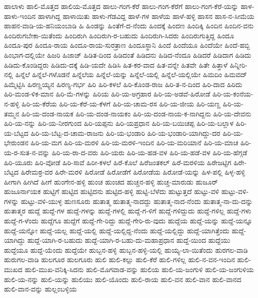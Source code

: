 {ಹಾಲಾಳು
ಹಾಲಿ-ಮೊತ್ತದ
ಹಾಲಿಯ-ಮೊತ್ತದ
ಹಾಲು-ಗಂಗ-ಕೆರೆ
ಹಾಲು-ಗಂಗ-ಕೆರೆಗೆ
ಹಾಲು-ಗಂಗ-ಕೆರೆ-ಯನ್ನು
ಹಾಳ-ಹಾಳು-ಇಂದಿನ
ಹಾಳಾಗಿದ್ದ
ಹಾಳಾಯಿತು
ಹಾಳು-ಗೆಡವಿದ್ದ
ಹಾಳೆ-ಗಳ
ಹಾಳೆಯ
ಹಾಳೆ-ಹಳ್ಳಿ
ಹಾಸನ
ಹಾಸ-ನ-ಸೀಮೆಯ
ಹಾಹನ-ವಾಡಿ-ಯ-ಹನಿಯಂಬಾಡಿ
ಹಿ
ಹಿಂಡನ್ನು
ಹಿಂತೆಗೆ-ದ-ನೆಂದು
ಹಿಂದಕ್ಕೆ
ಹಿಂದಣ
ಹಿಂದಿಕ್ಕಿ
ಹಿಂದಿನ
ಹಿಂದಿನ-ವನು
ಹಿಂದಿರುಗಬೇಕಾ-ಯಿತೆಂದು
ಹಿಂದಿರುಗಿ
ಹಿಂದಿರುಗಿ-ರ-ಬಹುದು
ಹಿಂದಿರುಗಿ-ಸಿದರು
ಹಿಂದಿರುಗುತ್ತಿದ್ದ
ಹಿಂದೂ
ಹಿಂದೂ-ಪುರ
ಹಿಂದೂ-ರಾಯ
ಹಿಂದೂ-ರಾಯ-ಸುರತ್ರಾಣ
ಹಿಂದೂಸ್ಥಾನಿ
ಹಿಂದೆ
ಹಿಂದೆಯೂ
ಹಿಂದೆಯೇ
ಹಿಂದೆ-ಹಬ್ಬಿ
ಹಿಂಭಾಗ-ದಲ್ಲಿಯೇ
ಹಿಜರಿ
ಹಿಜಾಜ್
ಹಿಡಿತ-ದಿಂದ
ಹಿಡಿದಂತೆ
ಹಿಡಿದನು
ಹಿಡಿದ-ನೆಂದೂ
ಹಿಡಿದರೆ
ಹಿಡಿದಾಗ
ಹಿಡಿದು
ಹಿಡಿದು-ಕೊಂಡಿದ್ದರು
ಹಿಡಿದು-ದಕ್ಕೆ
ಹಿಡಿ-ಯದೇ
ಹಿಡಿಸಿ
ಹಿತ-ಕರ-ವಾದ
ಹಿತ-ವನ್ನೇ
ಹಿತವೇ
ಹಿತೇ
ಹಿತ್ತಾಳೆ
ಹಿನ್ನೀರಿ-ನಲ್ಲಿ
ಹಿನ್ನೆಲೆ
ಹಿನ್ನೆಲೆ-ಗಳೊಡನೆ
ಹಿನ್ನೆಲೆಯ
ಹಿನ್ನೆಲೆ-ಯನ್ನು
ಹಿನ್ನೆಲೆ-ಯಲ್ಲಿ
ಹಿನ್ನೆಲೆ-ಯಲ್ಲಿಯೇ
ಹಿಮದಿಂ
ಹಿಮವದ್
ಹಿಮ್ಮೆಟ್ಟಿಸಿ
ಹಿರಣ್ಣಯ್ಯನ
ಹಿರಣ್ಯ-ಗರ್ಭ
ಹಿರಿ
ಹಿರಿ-ಕಳಲೆ
ಹಿರಿ-ಕೊಂಡ-ರಾಜ
ಹಿರಿ-ತ-ನ-ದಿಂದ
ಹಿರಿ-ದಾದ
ಹಿರಿದು
ಹಿರಿ-ಮಂಡ-ಳಿಕ-ಮಾನ
ಹಿರಿ-ಮೆ-ಗಳನ್ನು
ಹಿರಿಯ
ಹಿರಿ-ಯ-ಅಗ್ರಹಾರ
ಹಿರಿ-ಯ-ಅಡವೆ-ಹಿರೋಡೆ
ಹಿರಿ-ಯ-ಕಂನೆಯ-ನ-ಹಳ್ಳಿ
ಹಿರಿ-ಯ-ಕೆರೆಯ
ಹಿರಿ-ಯ-ಕೆರೆ-ಯ-ಕೆಳಗೆ
ಹಿರಿ-ಯ-ಚಾಮ-ರಸ
ಹಿರಿ-ಯ-ಜೀಯ
ಹಿರಿ-ಯಣ್ಣ
ಹಿರಿ-ಯ-ತಮ್ಮನ
ಹಿರಿ-ಯ-ದಂಡ-ನಾಯಕ
ಹಿರಿ-ಯ-ದಂಡ-ನಾಯಕಂ
ಹಿರಿ-ಯ-ದಂಡ-ನಾಯ-ಕ-ನಾಗಿದ್ದನು
ಹಿರಿ-ಯ-ದೇವನು
ಹಿರಿ-ಯ-ನನ್ನು
ಹಿರಿ-ಯ-ನೀರಗುಂದ
ಹಿರಿ-ಯಪ್ಪನು
ಹಿರಿ-ಯಪ್ರಧಾನ
ಹಿರಿ-ಯ-ಬಯಿಚಪ್ಪ
ಹಿರಿ-ಯ-ಬಲ್ಲಾಳ
ಹಿರಿ-ಯ-ಬೆಟ್ಟದ
ಹಿರಿ-ಯ-ಬೆಟ್ಟ-ದ-ಚಾಮ-ರಾಜನು
ಹಿರಿ-ಯ-ಭಂಡಾರಿ
ಹಿರಿ-ಯ-ಭಂಡಾರಿ-ಯಾಗಿದ್ದು-ದರ
ಹಿರಿ-ಯ-ಭೇರುಂಡನ
ಹಿರಿ-ಯ-ಮಗ
ಹಿರಿ-ಯ-ಮರಳಿ
ಹಿರಿ-ಯ-ಮರಳಿ-ಇಂದಿನ
ಹಿರಿ-ಯ-ಮರಿಯಾನೆ
ಹಿರಿ-ಯ-ಮಾಚ
ಹಿರಿ-ಯ-ರ-ಸುತ-ನ-ವನ್ನು
ಹಿರಿ-ಯ-ರಾ-ದ-ವರು
ಹಿರಿ-ಯರು
ಹಿರಿ-ಯ-ಹಡ-ವಳ
ಹಿರಿ-ಯ-ಹಡೆ-ವಳ
ಹಿರಿ-ಯ-ಹೆಗ್ಗಡೆ
ಹಿರಿ-ಯೂರು
ಹಿರಿ-ವೋಡೆ
ಹಿರಿ-ಸಾವೆ
ಹಿರೀ-ಕಳಲೆ
ಹಿರೆ-ಕೊಲೆ
ಹಿರೆಜಂತಕಲ್
ಹಿರೆ-ಮರಳಿಯ
ಹಿರೇಜಟ್ಟಿಗ
ಹಿರೇ-ಬೆಟ್ಟದ
ಹಿರೇಮಠ್ರ-ವರ
ಹಿರೇ-ಮರಳಿ
ಹಿರೋಡೆ
ಹಿರೋಡೆಗೆ
ಹಿರೋಡೆಯ
ಹಿರೋಡೆ-ಯನ್ನು
ಹಿಳ-ಪಲ್ಲಿ
ಹಿಳ್ಳ-ಹಳ್ಳಿ
ಹೀಗಾಗಿ
ಹೀಗಿದೆ
ಹೀಗೆ
ಹುಂಗೇನ-ಹಳ್ಳಿ
ಹುಂಚ
ಹುಂಚದ
ಹುಚ್ಚನ-ಹಳ್ಳಿ
ಹುಚ್ಚ-ಮಾರುಡು
ಹುಜೂರ್
ಹುಜೂರ್ನಾಯಕ
ಹುಟ್ಟಿಗೆ
ಹುಟ್ಟಿದ
ಹುಟ್ಟಿದನು
ಹುಟ್ಟಿದ-ಹಳ್ಳಿ
ಹುಟ್ಟಿ-ಬೆಳೆದು
ಹುಟ್ಟುತ್ತದೆ
ಹುಟ್ಟು-ವಳಿ
ಹುಟ್ಟು-ವಳಿ-ಗಳನ್ನು
ಹುಟ್ಟು-ವಳಿ-ಯುಳ್ಳ
ಹುಣಸೂರು
ಹುತಾತ್ಮ
ಹುತಾತ್ಮ-ನಾದದ್ದು
ಹುತಾತ್ಮ-ನಾದ-ನೆಂದು
ಹುತಾತ್ಮ-ನಾ-ದು-ದನ್ನು
ಹುತಾತ್ಮರ
ಹುದ್ದೆ
ಹುದ್ದೆ-ಗಳ
ಹುದ್ದೆ-ಗಳನ್ನು
ಹುದ್ದೆ-ಗಳಲ್ಲಿ
ಹುದ್ದೆ-ಗ-ಳಿಗೆ
ಹುದ್ದೆ-ಗಳಿದ್ದುದು
ಹುದ್ದೆ-ಗಳಿಲ್ಲ
ಹುದ್ದೆ-ಗಳು
ಹುದ್ದೆ-ಗ-ಳೆಂದು
ಹುದ್ದೆಗೂ
ಹುದ್ದೆಗೆ
ಹುದ್ದೆ-ಗೇ-ರಿದ್ದು
ಹುದ್ದೆ-ಗೇರಿ-ರು-ವುದು
ಹುದ್ದೆಯ
ಹುದ್ದೆ-ಯನ್ನು
ಹುದ್ದೆ-ಯನ್ನೂ
ಹುದ್ದೆ-ಯನ್ನೋ
ಹುದ್ದೆ-ಯಲ್ಲ
ಹುದ್ದೆ-ಯಲ್ಲಿ
ಹುದ್ದೆ-ಯಲ್ಲಿದ್ದ-ನೆಂದು
ಹುದ್ದೆ-ಯಲ್ಲಿದ್ದು
ಹುದ್ದೆ-ಯಾಗಿತ್ತೆಂದು
ಹುದ್ದೆ-ಯಾಗಿದ್ದು
ಹುದ್ದೆ-ಯಾಗಿ-ರ-ಬಹುದು
ಹುದ್ದೆ-ಯಾಗಿ-ರ-ಬಹು-ದು-ಮಹಾಪ್ರಧಾನ
ಹುದ್ದೆ-ಯಿಂದ
ಹುದ್ದೆಯು
ಹುದ್ದೆಯೂ
ಹುದ್ದೆ-ಯೆಂದು
ಹುದ್ದೆಯೇ
ಹುಬ್ಬನ-ಹಳ್ಳಿ
ಹುಬ್ಬನ-ಹಳ್ಳಿ-ಯಲ್ಲಿ
ಹುಯ್ಯ-ಲಾ-ಯಿತೆಂದು
ಹುರಗಲ-ವಾಡಿ
ಹುರುಗಲ-ವಾಡಿ
ಹುಲಗೂರ
ಹುಲಗೂರು
ಹುಲಿ
ಹುಲಿ-ಕಲ್ಲು
ಹುಲಿ-ಕೆರೆ
ಹುಲಿ-ಗಳಿಲ್ಲ
ಹುಲಿ-ನ-ವನ-ಇಂದಿನ
ಹುಲಿ-ಮುಖದ
ಹುಲಿ-ಮುಖ-ವನಿಕ್ಕಿ-ಸಿದನು
ಹುಲಿ-ಮೊಗವಾಡ-ವನ್ನು
ಹುಲಿಯ
ಹುಲಿ-ಯ-ಜಂಗುಳಿ
ಹುಲಿ-ಯ-ಜಂಗುಳಿಯ
ಹುಲಿ-ಯ-ನನ್ನು
ಹುಲಿ-ಯನ್ನು
ಹುಲಿಯು
ಹುಲಿ-ಯೊಂದು
ಹುಲಿ-ರಾಯ
ಹುಲಿ-ವನ
ಹುಲಿ-ವಾನ
ಹುಲಿ-ವಾನದ
ಹುಲಿ-ವಾನ-ವನ್ನು
ಹುಲ್ಲಂಬಳ್ಳಿಯ
}
